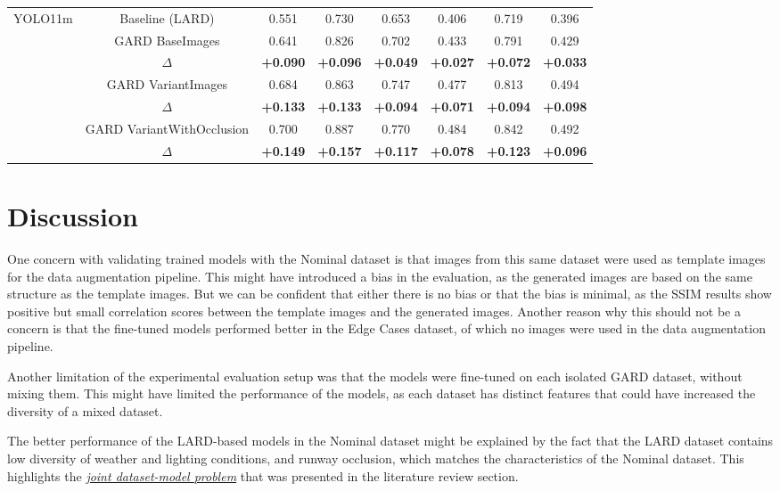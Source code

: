 \begin{table}[htbp]
\begin{tabular}{|c|c|ccc|ccc|}
\hline
\multirow{6}{*}{YOLO11m}
& Baseline (LARD) & 0.551 & 0.730 & 0.653 & 0.406 & 0.719 & 0.396 \\
& GARD BaseImages & 0.641 & 0.826 & 0.702 & 0.433 & 0.791 & 0.429 \\
& $\Delta$ & \textbf{+0.090} & \textbf{+0.096} & \textbf{+0.049} & \textbf{+0.027} & \textbf{+0.072} & \textbf{+0.033} \\
& GARD VariantImages & 0.684 & 0.863 & 0.747 & 0.477 & 0.813 & 0.494 \\
& $\Delta$ & \textbf{+0.133} & \textbf{+0.133} & \textbf{+0.094} & \textbf{+0.071} & \textbf{+0.094} & \textbf{+0.098} \\
& GARD VariantWithOcclusion & 0.700 & 0.887 & 0.770 & 0.484 & 0.842 & 0.492 \\
& $\Delta$ & \textbf{+0.149} & \textbf{+0.157} & \textbf{+0.117} & \textbf{+0.078} & \textbf{+0.123} & \textbf{+0.096} \\
\hline

\end{tabular}
\end{table}

\FloatBarrier
\section{Discussion}

One concern with validating trained models with the Nominal dataset is that
images from this same dataset were used as template images for the data
augmentation pipeline. This might have introduced a bias in the evaluation, as
the generated images are based on the same structure as the template images.
But we can be confident that either there is no bias or that the bias is
minimal, as the SSIM results show positive but small correlation scores between
the template images and the generated images. Another reason why this should not
be a concern is that the fine-tuned models performed better in the Edge Cases dataset, of which no images were used in the data augmentation pipeline.

Another limitation of the experimental evaluation setup was that the models were
fine-tuned on each isolated GARD dataset, without mixing them. This might have
limited the performance of the models, as each dataset has distinct features
that could have increased the diversity of a mixed dataset.

The better performance of the LARD-based models in the Nominal dataset might be
explained by the fact that the LARD dataset contains low diversity of weather
and lighting conditions, and runway occlusion, which matches the characteristics
of the Nominal dataset. This highlights the
\hyperref[sec:joint_hypothesis]{\emph{joint dataset-model problem}} that
was presented in the literature review section.

